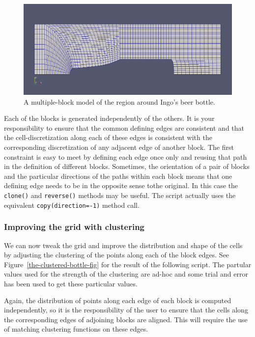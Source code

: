 \begin{figure}[htbp]
\begin{center}
\includegraphics[width=\textwidth]{../2D/beer-bottle/the_plain_bottle.png}
\end{center}
\caption{A multiple-block model of the region around Ingo's beer bottle.}
\label{the-plain-bottle-fig}
\end{figure}

\medskip
Each of the blocks is generated independently of the others.
It is your responsibility to ensure that the common defining edges are 
consistent and that the cell-discretization along each of these edges 
is consistent with the corresponding discretization of any adjacent edge 
of another block.
The first constraint is easy to meet by defining each edge once only and
reusing that path in the definition of different blocks.
Sometimes, the orientation of a pair of blocks and 
the particular directions of the paths within each block means that 
one defining edge needs to be in the opposite sense tothe original.
In this case the \texttt{clone()} and \texttt{reverse()} methods may be useful.
The script actually uses the equivalent \texttt{copy(direction=-1)} method call.

\subsubsection*{Improving the grid with clustering}
%
We can now tweak the grid and improve the distribution and shape of the cells
by adjusting the clustering of the points along each of the block edges.
See Figure~\ref{the-clustered-bottle-fig} for the result of the following script.
The partular values used for the strength of the clustering are ad-hoc and some
trial and error has been used to get these particular values.

\medskip
Again, the distribution of points along each edge of each block is computed independently,
so it is the responsibility of the user to ensure that the cells along the 
corresponding edges of adjoining blocks are aligned.
This will require the use of matching clustering functions on these edges.

